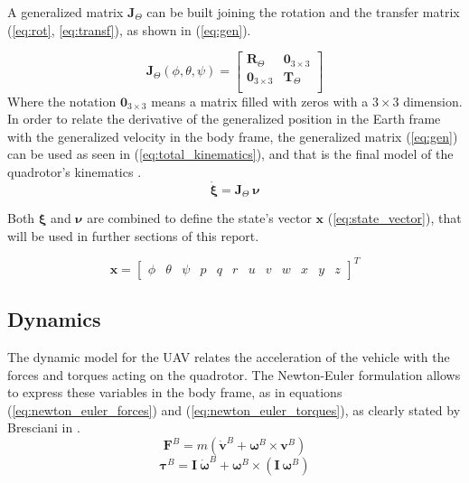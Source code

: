 \documentclass[journal]{IEEEtran}
\begin{document}
	A generalized matrix $\bm{J}_\Theta$ can be built joining the rotation and the transfer matrix (\ref{eq:rot}, \ref{eq:transf}), as shown in (\ref{eq:gen}).
	
	\begin{equation} \label{eq:gen}
	\bm{J}_\Theta (\phi,\theta, \psi)= \left[ {\begin{array}{cc}
		\bm{R}_\Theta &  \mathbf{0}_{3\times 3} \\
		\mathbf{0}_{3\times 3} & \bm{T}_\Theta \\
		\end{array} } \right]
	\end{equation}  
	Where the notation $\mathbf{0}_{3\times 3}$ means a matrix filled with zeros with a $3 \times 3$ dimension.\\
	
	In order to relate the derivative of the generalized position in the Earth frame with the generalized velocity in the body frame, the generalized matrix (\ref{eq:gen}) can be used as seen in (\ref{eq:total_kinematics}), and that is the final model of the quadrotor's kinematics \cite{SabatinoFrancesco2015Qcmn, mod_control_bresciani}.
	\begin{equation} \label{eq:total_kinematics}
	\bm{\dot\xi} = \bm{J}_\Theta \ 	\bm{\nu} 
	\end{equation} 
	
	Both $\bm{\xi}$ and $\bm{\nu}$ are combined to define the state's vector $\bm{x}$ (\ref{eq:state_vector}), that will be used in further sections of this report.
	
	\begin{equation} \label{eq:state_vector}
		\bm{x} = \left[ \begin{array}{cccccccccccc}
			\phi & \theta & \psi & p & q & r & u & v & w & x & y & z
			\end{array}\right] ^T
		\end{equation}
	
	\subsection{Dynamics}
	The dynamic model for the UAV relates the acceleration of the vehicle with the forces and torques acting on the quadrotor. The Newton-Euler formulation allows to express these variables in the body frame, as in equations (\ref{eq:newton_euler_forces}) and (\ref{eq:newton_euler_torques}), as clearly stated by Bresciani in \cite{mod_control_bresciani}.
	\begin{equation} \label{eq:newton_euler_forces}
	\bm{F}^B = m ( \bm{\dot v}^B + \bm{\omega}^B \times \bm{v}^B)
	\end{equation}
	\begin{equation} \label{eq:newton_euler_torques}
	\bm{\tau}^B = \bm{I} \ \bm{\dot \omega}^B + \bm{\omega}^B \times (\bm{I} \ \bm{\omega}^B)
	\end{equation}
	
\end{document}
